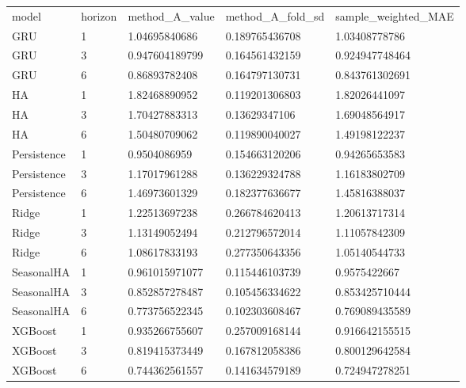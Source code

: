 \begin{longtable}{lllll}
model & horizon & method\_A\_value & method\_A\_fold\_sd & sample\_weighted\_MAE \\
GRU & 1 & 1.04695840686 & 0.189765436708 & 1.03408778786 \\
GRU & 3 & 0.947604189799 & 0.164561432159 & 0.924947748464 \\
GRU & 6 & 0.86893782408 & 0.164797130731 & 0.843761302691 \\
HA & 1 & 1.82468890952 & 0.119201306803 & 1.82026441097 \\
HA & 3 & 1.70427883313 & 0.13629347106 & 1.69048564917 \\
HA & 6 & 1.50480709062 & 0.119890040027 & 1.49198122237 \\
Persistence & 1 & 0.9504086959 & 0.154663120206 & 0.94265653583 \\
Persistence & 3 & 1.17017961288 & 0.136229324788 & 1.16183802709 \\
Persistence & 6 & 1.46973601329 & 0.182377636677 & 1.45816388037 \\
Ridge & 1 & 1.22513697238 & 0.266784620413 & 1.20613717314 \\
Ridge & 3 & 1.13149052494 & 0.212796572014 & 1.11057842309 \\
Ridge & 6 & 1.08617833193 & 0.277350643356 & 1.05140544733 \\
SeasonalHA & 1 & 0.961015971077 & 0.115446103739 & 0.9575422667 \\
SeasonalHA & 3 & 0.852857278487 & 0.105456334622 & 0.853425710444 \\
SeasonalHA & 6 & 0.773756522345 & 0.102303608467 & 0.769089435589 \\
XGBoost & 1 & 0.935266755607 & 0.257009168144 & 0.916642155515 \\
XGBoost & 3 & 0.819415373449 & 0.167812058386 & 0.800129642584 \\
XGBoost & 6 & 0.744362561557 & 0.141634579189 & 0.724947278251 \\
\end{longtable}
